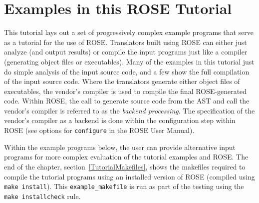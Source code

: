 \section{Examples in this ROSE Tutorial}

    This tutorial lays out a set of progressively
complex example programs that serve as a tutorial for the use of ROSE.
Translators built using ROSE can either just analyze (and output results)
or compile the input programs just like a compiler (generating object files 
or executables).  Many of the examples in this tutorial just do simple analysis
of the input source code, and a few show the full compilation of the input source code.
Where the translators generate either object files of executables, the 
vendor's compiler is used to compile the final ROSE-generated code.  Within
ROSE, the call to generate source code from the AST and call the vendor's compiler
is referred to as the {\em backend processing}.  The specification of the vendor's compiler
as a backend is done within the configuration step within ROSE (see options for 
{\tt configure} in the ROSE User Manual).

   Within the example programs below, the user can provide alternative input programs
for more complex evaluation of the tutorial examples and ROSE.  The end of the chapter,
section~\ref{TutorialMakefiles}, shows the makefiles required to compile the
tutorial programs using an installed version of ROSE (compiled using 
{\tt make install}).  This {\tt example\_makefile} is run as part of the testing using the 
{\tt make installcheck} rule.



